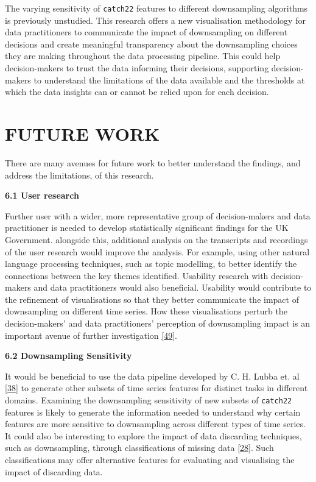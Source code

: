 \documentclass{article}
\begin{document}
The varying sensitivity of \texttt{catch22} features to different
downsampling algorithms is previously unstudied. This research offers a
new visualisation methodology for data practitioners to communicate the
impact of downsampling on different decisions and create meaningful
transparency about the downsampling choices they are making throughout
the data processing pipeline. This could help decision-makers to trust
the data informing their decisions, supporting decision-makers to
understand the limitations of the data available and the thresholds at
which the data insights can or cannot be relied upon for each decision.

\hypertarget{future-work}{%
\section{FUTURE WORK}\label{future-work}}

There are many avenues for future work to better understand the
findings, and address the limitations, of this research.

\textbf{6.1 User research}

Further user with a wider, more representative group of decision-makers
and data practitioner is needed to develop statistically significant
findings for the UK Government. alongside this, additional analysis on
the transcripts and recordings of the user research would improve the
analysis. For example, using other natural language processing
techniques, such as topic modelling, to better identify the connections
between the key themes identified. Usability research with
decision-makers and data practitioners would also beneficial. Usability
would contribute to the refinement of visualisations so that they better
communicate the impact of downsampling on different time series. How
these visualisations perturb the decision-makers' and data
practitioners' perception of downsampling impact is an important avenue
of further investigation
\protect\hyperlink{ref-graphsampling}{{[}49{]}}.

\textbf{6.2 Downsampling Sensitivity}

It would be beneficial to use the data pipeline developed by C. H. Lubba
et. al \protect\hyperlink{ref-catch22}{{[}38{]}} to generate other
subsets of time series features for distinct tasks in different domains.
Examining the downsampling sensitivity of new subsets of
\texttt{catch22} features is likely to generate the information needed
to understand why certain features are more sensitive to downsampling
across different types of time series. It could also be interesting to
explore the impact of data discarding techniques, such as downsampling,
through classifications of missing data
\protect\hyperlink{ref-missingdata}{{[}28{]}}. Such classifications may
offer alternative features for evaluating and visualising the impact of
discarding data.
\end{document}
